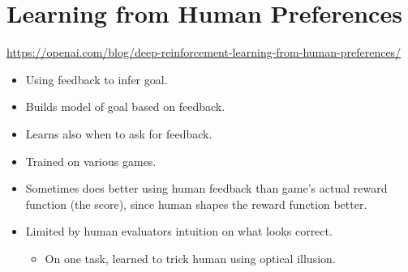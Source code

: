 \section{Learning from Human Preferences}

\url{https://openai.com/blog/deep-reinforcement-learning-from-human-preferences/}

\begin{itemize}
    \item Using feedback to infer goal.
    \item Builds model of goal based on feedback.
    \item Learns also when to ask for feedback.
    \item Trained on various games.
    \item Sometimes does better using human feedback than game's actual reward function (the score), since human shapes the reward function better.
    \item Limited by human evaluators intuition on what looks correct.
    \begin{itemize}
        \item On one task, learned to trick human using optical illusion.
    \end{itemize}
\end{itemize}